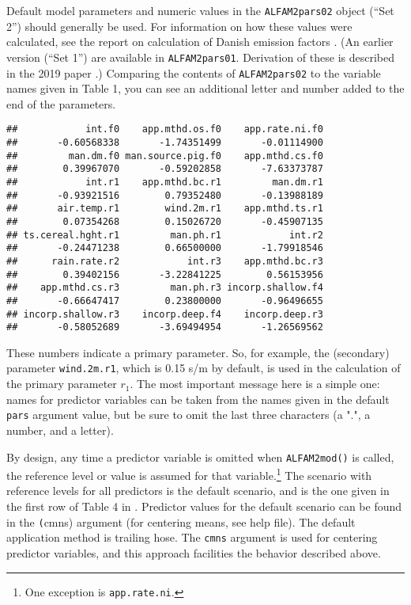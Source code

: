 \documentclass{article}
\begin{document}
Default model parameters and numeric values in the \texttt{ALFAM2pars02} object (``Set 2'') should generally be used. 
For information on how these values were calculated, see the report on calculation of Danish emission factors \cite{efreport2021}.
(An earlier version (``Set 1'') are available in \texttt{ALFAM2pars01}. Derivation of these is described in the 2019 paper \cite{afmod2019}.) 
Comparing the contents of \texttt{ALFAM2pars02} to the variable names given in Table 1, you can see an additional letter and number added to the end of the parameters. 

\begin{knitrout}
\color{fgcolor}\begin{kframe}
\begin{alltt}
\end{alltt}
\begin{verbatim}
##            int.f0    app.mthd.os.f0    app.rate.ni.f0 
##       -0.60568338       -1.74351499       -0.01114900 
##         man.dm.f0 man.source.pig.f0    app.mthd.cs.f0 
##        0.39967070       -0.59202858       -7.63373787 
##            int.r1    app.mthd.bc.r1         man.dm.r1 
##       -0.93921516        0.79352480       -0.13988189 
##       air.temp.r1        wind.2m.r1    app.mthd.ts.r1 
##        0.07354268        0.15026720       -0.45907135 
## ts.cereal.hght.r1         man.ph.r1            int.r2 
##       -0.24471238        0.66500000       -1.79918546 
##      rain.rate.r2            int.r3    app.mthd.bc.r3 
##        0.39402156       -3.22841225        0.56153956 
##    app.mthd.cs.r3         man.ph.r3 incorp.shallow.f4 
##       -0.66647417        0.23800000       -0.96496655 
## incorp.shallow.r3    incorp.deep.f4    incorp.deep.r3 
##       -0.58052689       -3.69494954       -1.26569562
\end{verbatim}
\end{kframe}
\end{knitrout}

These numbers indicate a primary parameter.
So, for example, the (secondary) parameter \texttt{wind.2m.r1}, which is 0.15 s/m by default, is used in the calculation of the primary parameter $r_1$.
The most important message here is a simple one: names for predictor variables can be taken from the names given in the default \texttt{pars} argument value, but be sure to omit the last three characters (a ".", a number, and a letter).

By design, any time a predictor variable is omitted when \texttt{ALFAM2mod()} is called, the reference level or value is assumed for that variable.\footnote{
One exception is \texttt{app.rate.ni}.
}
The scenario with reference levels for all predictors is the default scenario, and is the one given in the first row of Table 4 in \cite{afmod2019}.
Predictor values for the default scenario can be found in the \texttt(cmns) argument (for centering means, see help file).
The default application method is trailing hose.
The \texttt{cmns} argument is used for centering predictor variables, and this approach facilities the behavior described above.
\end{document}
